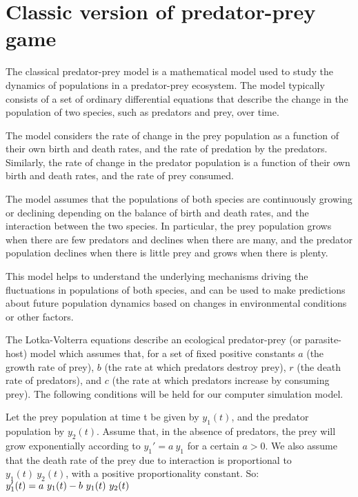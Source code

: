 \section{Classic version of predator-prey game}


The classical predator-prey model is a mathematical model used to study the dynamics of populations in a predator-prey ecosystem. The model typically consists of a set of ordinary differential equations that describe the change in the population of two species, such as predators and prey, over time.

The model considers the rate of change in the prey population as a function of their own birth and death rates, and the rate of predation by the predators. Similarly, the rate of change in the predator population is a function of their own birth and death rates, and the rate of prey consumed.

The model assumes that the populations of both species are continuously growing or declining depending on the balance of birth and death rates, and the interaction between the two species. In particular, the prey population grows when there are few predators and declines when there are many, and the predator population declines when there is little prey and grows when there is plenty.

This model helps to understand the underlying mechanisms driving the fluctuations in populations of both species, and can be used to make predictions about future population dynamics based on changes in environmental conditions or other factors.

The Lotka-Volterra equations describe an ecological predator-prey (or parasite-host) model which assumes that, for a set of fixed positive constants \(a\) (the growth rate of prey), \(b\) (the rate at which predators destroy prey), \(r\) (the death rate of predators), and \(c\) (the rate at which predators increase by consuming prey). The following conditions will be held for our computer simulation model.

Let the prey population at time t be given by \(y_1(t)\), and the predator population by \(y_2(t)\). Assume that, in the absence of predators, the prey will grow exponentially according to \(y_1' = a \ y_1\) for a certain \(a > 0\). We also assume that the death rate of the prey due to interaction is proportional to \(y_1(t) \ y_2(t)\), with a positive proportionality constant. So:
\(\\ y_1' (t) = a\ y_1(t) - b\ y_1(t)\ y_2(t)   \)

